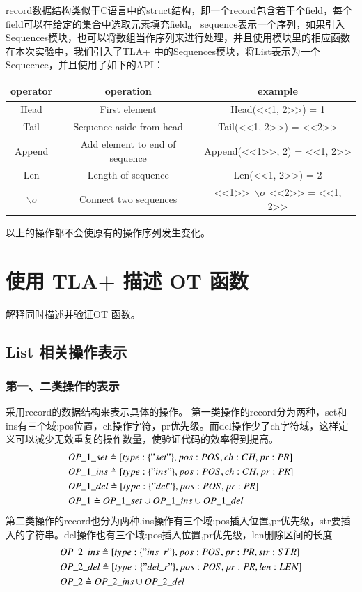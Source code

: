 record数据结构类似于C语言中的struct结构，即一个record包含若干个field，每个field可以在给定的集合中选取元素填充field。
sequence表示一个序列，如果引入Sequences模块，也可以将数组当作序列来进行处理，并且使用模块里的相应函数
在本次实验中，我们引入了TLA+ 中的Sequences模块，将List表示为一个Sequecnce，并且使用了如下的API：\\
\begin{tabular}{ccc}
\hline
operator& operation& example \\
\hline  
 Head& First element &Head(<<1, 2>>) = 1\\
 Tail& Sequence aside from head &Tail(<<1, 2>>) = <<2>>\\
 Append& Add element to end of sequence &Append(<<1>>, 2) = <<1, 2>>\\ 
 Len& Length of sequence &Len(<<1, 2>>) = 2\\
 $\backslash o$& Connect two sequences &<<1>>\ $\backslash o$\ <<2>> = <<1, 2>>\\
\hline %
\end{tabular}
\par 以上的操作都不会使原有的操作序列发生变化。

\section{使用 TLA+ 描述 OT 函数}
解释同时描述并验证OT 函数。	 	
\subsection{List 相关操作表示}
\subsubsection{第一、二类操作的表示}
采用record的数据结构来表示具体的操作。
第一类操作的record分为两种，set和ins有三个域:pos位置，ch操作字符，pr优先级。而del操作少了ch字符域，这样定义可以减少无效重复的操作数量，使验证代码的效率得到提高。
\begin{align*}
&OP\_1\_set \triangleq [type: \{"set"\}, pos: POS, ch: CH, pr:PR] \\
&OP\_1\_ins \triangleq [type: \{"ins"\}, pos: POS, ch: CH, pr:PR] \\
&OP\_1\_del \triangleq [type: \{"del"\}, pos: POS, pr:PR] \\
&OP\_1 \triangleq OP\_1\_set \cup OP\_1\_ins \cup OP\_1\_del
\end{align*}
第二类操作的record也分为两种,ins操作有三个域:pos插入位置,pr优先级，str要插入的字符串。del操作也有三个域:pos插入位置,pr优先级，len删除区间的长度
\begin{align*}
&OP\_2\_ins \triangleq [type: \{"ins\_r"\}, pos: POS, pr:PR, str:STR] \\
&OP\_2\_del \triangleq [type: \{"del\_r"\}, pos: POS, pr:PR, len:LEN] \\
&OP\_2 \triangleq  OP\_2\_ins \cup OP\_2\_del 
\end{align*}

